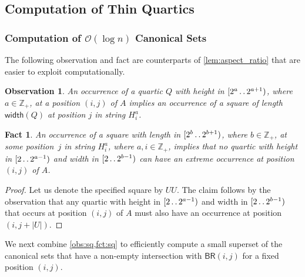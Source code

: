 \documentclass[11pt,letterpaper]{article}
\newcommand{\cO}{\mathcal{O}}
\newcommand{\width}{\textsf{width}}
\newcommand{\BR}{\textsf{BR}}
\def\dd{\mathinner{.\,.}}
\newcommand{\hmeta}[2]{H_{#1}^{#2}}
\newtheorem{observation}[theorem]{Observation}
\newtheorem{fact}[theorem]{Fact}
\begin{document}
\subsection{Computation of Thin Quartics}
\label{ComputeThin}
\subsubsection{Computation of $\cO(\log n)$ Canonical Sets}

The following observation and fact are counterparts of \cref{lem:aspect_ratio} that are easier to exploit computationally.

\begin{observation}\label{obs:sq}
An occurrence of a quartic $Q$ with height in $[2^a \dd 2^{a+1})$, where $a \in \mathbb{Z}_{+}$,
at a position $(i,j)$ of $A$ implies an occurrence of a square of length $\width(Q)$ at position $j$ in string $\hmeta{i}{a}$.
\end{observation}

\begin{fact}\label{fct:sq}
An occurrence of a square with length in $[2^b \dd 2^{b+1})$, where $b \in \mathbb{Z}_{+}$, at some position~$j$ in string $\hmeta{i}{a}$, where $a, i \in \mathbb{Z}_{+}$, implies that no quartic with height in $[2 \dd 2^{a-1})$ and width in $[2 \dd 2^{b-1})$ can have an extreme occurrence at position $(i,j)$ of $A$.
\end{fact}
\begin{proof}
Let us denote the specified square by $UU$.
The claim follows by the observation that any quartic with height in $[2 \dd 2^{a-1})$ and width in $[2 \dd 2^{b-1})$ that occurs at position $(i,j)$ of $A$
must also have an occurrence at position $(i,j+|U|)$.
\end{proof}

We next combine \cref{obs:sq,fct:sq} to efficiently compute a small superset of the canonical sets that have a non-empty intersection with $\BR(i,j)$ for a fixed position $(i,j)$.
\end{document}
